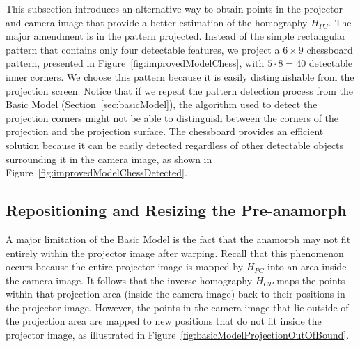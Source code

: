\documentclass[11pt, oneside, reqno]{book}
\begin{document}
This subsection introduces an alternative way to obtain points in the projector and camera image that provide a better estimation of the homography $H_{PC}$. The major amendment is in the pattern projected. Instead of the simple rectangular pattern that contains only four detectable features, we project a $6\times 9$ chessboard pattern, presented in Figure~\ref{fig:improvedModelChess}, with $5\cdot 8 = 40$ detectable inner corners. We choose this pattern because it is easily distinguishable from the projection screen. Notice that if we repeat the pattern detection process from the Basic Model (Section~\ref{sec:basicModel}), the algorithm used to detect the projection corners might not be able to distinguish between the corners of the projection and the projection surface. The chessboard provides an efficient solution because it can be easily detected regardless of other detectable objects surrounding it in the camera image, as shown in Figure~\ref{fig:improvedModelChessDetected}. 





\subsection{Repositioning and Resizing the Pre-anamorph}
\label{ssec:improvedModelReshapePreAnamorph}

A major limitation of the Basic Model is the fact that the anamorph may not fit entirely within the projector image after warping. Recall that this phenomenon occurs because the entire projector image is mapped by $H_{PC}$ into an area inside the camera image. It follows that the inverse homography $H_{CP}$ maps the points within that projection area (inside the camera image) back to their positions in the projector image. However, the points in the camera image that lie outside of the projection area are mapped to new positions that do not fit inside the projector image, as illustrated in Figure~\ref{fig:basicModelProjectionOutOfBound}.
\end{document}
